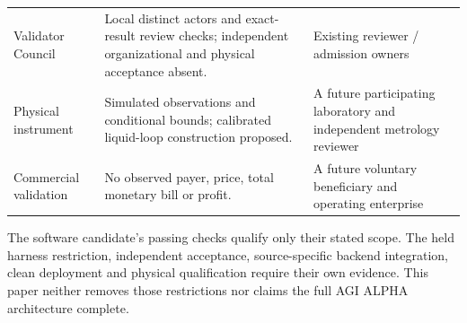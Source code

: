 \documentclass[11pt,a4paper]{article}
\begin{document}
\begin{longtable}{@{}P{31mm}P{77mm}P{46mm}@{}}
Validator Council & Local distinct actors and exact-result review checks; independent organizational and physical acceptance absent. & Existing reviewer / admission owners\\
Physical instrument & Simulated observations and conditional bounds; calibrated liquid-loop construction proposed. & A future participating laboratory and independent metrology reviewer\\
Commercial validation & No observed payer, price, total monetary bill or profit. & A future voluntary beneficiary and operating enterprise\\
\bottomrule
\end{longtable}

The software candidate's passing checks qualify only their stated scope. The held harness restriction, independent acceptance, source-specific backend integration, clean deployment and physical qualification require their own evidence. This paper neither removes those restrictions nor claims the full AGI ALPHA architecture complete.



\end{document}
